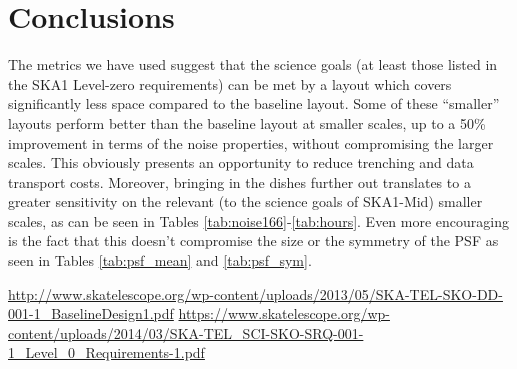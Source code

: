 \documentclass[sfheadings,a4paper,times,9pt,floats,floatfix]{article}
\begin{document}
\section{Conclusions}\label{sec:conclusion}
\vspace{-.1cm}
The metrics we have used suggest that the science goals (at least those listed in the SKA1 Level-zero requirements) can be met by
a layout which covers significantly less space compared to the baseline layout. Some of these ``smaller'' layouts perform better
than the baseline layout at smaller scales, up to a 50\% improvement in terms of the noise properties, without compromising the
larger scales. This obviously presents an opportunity to reduce trenching and data transport costs. Moreover, bringing in the
dishes further out translates to a greater sensitivity on the relevant (to the science goals of SKA1-Mid) smaller scales, as can
be seen in Tables \ref{tab:noise166}-\ref{tab:hours}. Even more encouraging is the fact that this doesn't compromise the size or
the symmetry of the PSF as seen in Tables \ref{tab:psf_mean} and \ref{tab:psf_sym}.
\begin{thebibliography}{99}
  \url{http://www.skatelescope.org/wp-content/uploads/2013/05/SKA-TEL-SKO-DD-001-1_BaselineDesign1.pdf}
  \url{https://www.skatelescope.org/wp-content/uploads/2014/03/SKA-TEL_SCI-SKO-SRQ-001-1_Level_0_Requirements-1.pdf}
\end{thebibliography}






\end{document}
